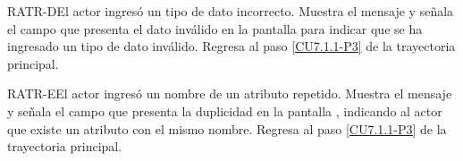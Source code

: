 	\begin{UCtrayectoriaA}{RATR-D}{El actor ingresó un tipo de dato incorrecto.}
		\UCpaso[\UCsist] Muestra el mensaje  y señala el campo que presenta el dato inválido en la pantalla  para indicar que se ha ingresado un tipo de dato inválido.
		\UCpaso Regresa al paso \ref{CU7.1.1-P3} de la trayectoria principal.
	\end{UCtrayectoriaA}

	\begin{UCtrayectoriaA}{RATR-E}{El actor ingresó un nombre de un atributo repetido.}
		\UCpaso[\UCsist] Muestra el mensaje  y señala el campo que presenta la duplicidad en la pantalla , indicando al actor que existe un atributo con el mismo nombre.
		\UCpaso Regresa al paso \ref{CU7.1.1-P3} de la trayectoria principal.
	\end{UCtrayectoriaA}



